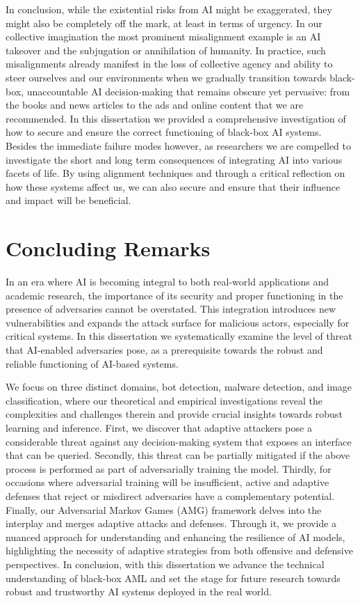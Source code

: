 In conclusion, while the existential risks from AI might be exaggerated, they might also be completely off the mark, at least in terms of urgency.
In our collective imagination the most prominent misalignment example is an \gls{AI} takeover and the subjugation or annihilation of humanity.
In practice, such misalignments already manifest in the loss of collective agency and ability to steer ourselves and our environments when we gradually transition towards black-box, unaccountable \gls{AI} decision-making that remains obscure yet pervasive: from the books and news articles to the ads and online content that we are recommended.
In this dissertation we provided a comprehensive investigation of how to secure and ensure the correct functioning of black-box \gls{AI} systems.
Besides the immediate failure modes however, as researchers we are compelled to investigate the short and long term consequences of integrating \gls{AI} into various facets of life.
By using alignment techniques and through a critical reflection on how these systems affect us, we can also secure and ensure that their influence and impact will be beneficial.

\section{Concluding Remarks}

In an era where \gls{AI} is becoming integral to both real-world applications and academic research, the importance of its security and proper functioning in the presence of adversaries cannot be overstated.
This integration introduces new vulnerabilities and expands the attack surface for malicious actors, especially for critical systems. 
In this dissertation we systematically examine the level of threat that AI-enabled adversaries pose, as a prerequisite towards the robust and reliable functioning of AI-based systems.

We focus on three distinct domains, bot detection, malware detection, and image classification, where our theoretical and empirical investigations reveal the complexities and challenges therein and provide crucial insights towards robust learning and inference.
First, we discover that adaptive attackers pose a considerable threat against any decision-making system that exposes an interface that can be queried.
Secondly, this threat can be partially mitigated if the above process is performed as part of adversarially training the model.
Thirdly, for occasions where adversarial training will be insufficient, active and adaptive defenses that reject or misdirect adversaries have a complementary potential.
Finally, our Adversarial Markov Games (AMG) framework delves into the interplay and merges adaptive attacks and defenses.
Through it, we provide a nuanced approach for understanding and enhancing the resilience of AI models, highlighting the necessity of adaptive strategies from both offensive and defensive perspectives.
In conclusion, with this dissertation we advance the technical understanding of black-box \gls{AML} and set the stage for future research towards robust and trustworthy \gls{AI} systems deployed in the real world.

\cleardoublepage